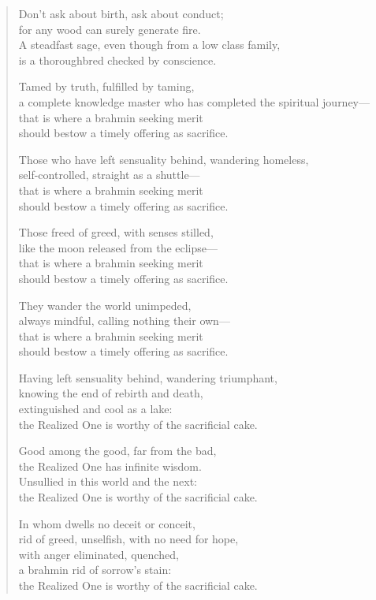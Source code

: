 \documentclass[12pt,openany]{book}%
\begin{document}
\begin{verse}%
Don’t ask about birth, ask about conduct; \\
for any wood can surely generate fire. \\
A steadfast sage, even though from a low class family, \\
is a thoroughbred checked by conscience. 

Tamed by truth, fulfilled by taming, \\
a complete knowledge master who has completed the spiritual journey—\\
that is where a brahmin seeking merit \\
should bestow a timely offering as sacrifice. 

Those who have left sensuality behind, wandering homeless, \\
self-controlled, straight as a shuttle—\\
that is where a brahmin seeking merit \\
should bestow a timely offering as sacrifice. 

Those freed of greed, with senses stilled, \\
like the moon released from the eclipse—\\
that is where a brahmin seeking merit \\
should bestow a timely offering as sacrifice. 

They wander the world unimpeded, \\
always mindful, calling nothing their own—\\
that is where a brahmin seeking merit \\
should bestow a timely offering as sacrifice. 

Having left sensuality behind, wandering triumphant, \\
knowing the end of rebirth and death, \\
extinguished and cool as a lake: \\
the Realized One is worthy of the sacrificial cake. 

Good among the good, far from the bad, \\
the Realized One has infinite wisdom. \\
Unsullied in this world and the next: \\
the Realized One is worthy of the sacrificial cake. 

In whom dwells no deceit or conceit, \\
rid of greed, unselfish, with no need for hope, \\
with anger eliminated, quenched, \\
a brahmin rid of sorrow’s stain: \\
the Realized One is worthy of the sacrificial cake. 


\end{verse}
\end{document}
